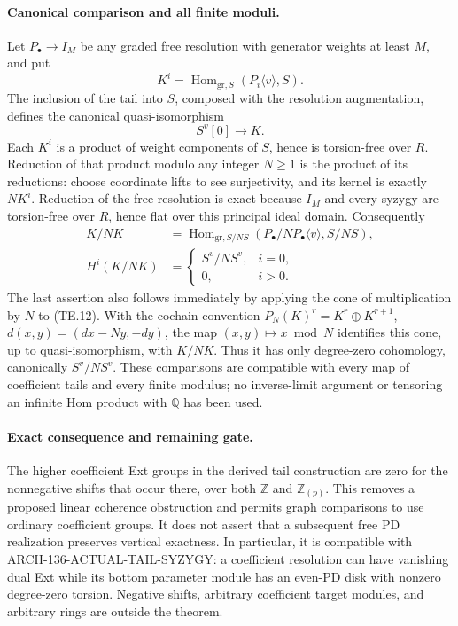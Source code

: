 \paragraph{Canonical comparison and all finite moduli.}
Let \(P_\bullet\to I_M\) be any graded free resolution with
generator weights at least \(M\), and put
\[
 K^i=\operatorname{Hom}_{\mathrm{gr},S}(P_i\langle v\rangle,S).
\]
The inclusion of the tail into \(S\), composed with the resolution
augmentation, defines the canonical quasi-isomorphism
\[
                         S^v[0]\longrightarrow K.       \tag{TE.12}
\]
Each \(K^i\) is a product of weight components of \(S\), hence
is torsion-free over \(R\).  Reduction of that product modulo
any integer \(N\geq1\) is the product of its reductions: choose
coordinate lifts to see surjectivity, and its kernel is exactly
\(N K^i\).  Reduction of the free resolution is exact because
\(I_M\) and every syzygy are torsion-free over \(R\), hence
flat over this principal ideal domain.  Consequently
\[
 \begin{split}
 K/NK&=\operatorname{Hom}_{\mathrm{gr},S/NS}
                 (P_\bullet/NP_\bullet\langle v\rangle,S/NS),\\
 H^i(K/NK)&=
 \begin{cases}S^v/NS^v,&i=0,\\0,&i>0.
 \end{cases}
 \end{split}                                             \tag{TE.13}
\]
The last assertion also follows immediately by applying the cone
of multiplication by \(N\) to (TE.12).  With the cochain convention
\(P_N(K)^r=K^r\oplus K^{r+1}\),
\(d(x,y)=(dx-Ny,-dy)\), the map
\((x,y)\mapsto x\bmod N\) identifies this cone, up to
quasi-isomorphism, with \(K/NK\).  Thus it has only degree-zero
cohomology, canonically \(S^v/NS^v\).  These comparisons are
compatible with every map of coefficient tails and every finite
modulus; no inverse-limit argument or tensoring an infinite Hom
product with \(\mathbb Q\) has been used.

\paragraph{Exact consequence and remaining gate.}
The higher coefficient Ext groups in the derived tail construction
are zero for the nonnegative shifts that occur there, over both
\(\mathbb Z\) and \(\mathbb Z_{(p)}\).  This removes a proposed
linear coherence obstruction and permits graph comparisons to use
ordinary coefficient groups.  It does not assert that a subsequent
free PD realization preserves vertical exactness.  In particular,
it is compatible with ARCH-136-ACTUAL-TAIL-SYZYGY: a coefficient
resolution can have vanishing dual Ext while its bottom parameter
module has an even-PD disk with nonzero degree-zero torsion.
Negative shifts, arbitrary coefficient target modules, and arbitrary
rings are outside the theorem.

